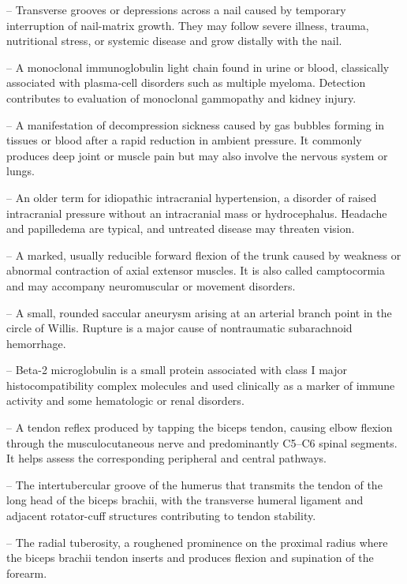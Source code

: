 -- Transverse grooves or depressions across a nail caused by temporary interruption of nail-matrix growth. They may follow severe illness, trauma, nutritional stress, or systemic disease and grow distally with the nail.

-- A monoclonal immunoglobulin light chain found in urine or blood, classically associated with plasma-cell disorders such as multiple myeloma. Detection contributes to evaluation of monoclonal gammopathy and kidney injury.

-- A manifestation of decompression sickness caused by gas bubbles forming in tissues or blood after a rapid reduction in ambient pressure. It commonly produces deep joint or muscle pain but may also involve the nervous system or lungs.

-- An older term for idiopathic intracranial hypertension, a disorder of raised intracranial pressure without an intracranial mass or hydrocephalus. Headache and papilledema are typical, and untreated disease may threaten vision.

-- A marked, usually reducible forward flexion of the trunk caused by weakness or abnormal contraction of axial extensor muscles. It is also called camptocormia and may accompany neuromuscular or movement disorders.

-- A small, rounded saccular aneurysm arising at an arterial branch point in the circle of Willis. Rupture is a major cause of nontraumatic subarachnoid hemorrhage.

-- Beta-2 microglobulin is a small protein associated with class I major histocompatibility complex molecules and used clinically as a marker of immune activity and some hematologic or renal disorders.

-- A tendon reflex produced by tapping the biceps tendon, causing elbow flexion through the musculocutaneous nerve and predominantly C5--C6 spinal segments. It helps assess the corresponding peripheral and central pathways.

-- The intertubercular groove of the humerus that transmits the tendon of the long head of the biceps brachii, with the transverse humeral ligament and adjacent rotator-cuff structures contributing to tendon stability.

-- The radial tuberosity, a roughened prominence on the proximal radius where the biceps brachii tendon inserts and produces flexion and supination of the forearm.

